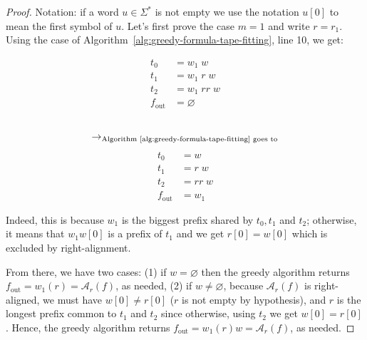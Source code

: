 \begin{proof}
    Notation: if a word $u\in\Sigma^*$ is not empty we use the notation $u[0]$ to mean the first symbol of $u$.
    Let's first prove the case $m=1$ and write $r = r_1$. Using the case of Algorithm~\ref{alg:greedy-formula-tape-fitting}, line 10, we get:
    \setlength{\columnsep}{-7.5cm}
    \begin{multicols}{3}
        \noindent
        \begin{align*}
            t_0          & = w_1\;  w      \\
            t_1          & = w_1\; r\;  w  \\
            t_2          & = w_1\; r r\; w \\
            f_\text{out} & = \varnothing
        \end{align*}
        \begin{align*}
             & \\
            \to_{\text{Algorithm~\ref{alg:greedy-formula-tape-fitting} goes to}}
        \end{align*}
        \begin{align*}
            t_0          & = w        \\
            t_1          & = r\;  w   \\
            t_2          & = r r\;  w \\
            f_\text{out} & = w_1
        \end{align*}
    \end{multicols}

    Indeed, this is because $w_1$ is the biggest prefix shared by $t_0, t_1$ and $t_2$; otherwise, it means that $w_1w[0]$ is a prefix of $t_1$ and we get $r[0] = w[0]$ which is excluded by right-alignment.

    From there, we have two cases: (1) if $w = \varnothing$ then the greedy algorithm returns $f_\text{out} = w_1 (r) = \mathcal{A}_r(f)$, as needed, (2) if $w \neq \varnothing$, because $\mathcal{A}_r(f)$ is right-aligned, we must have $w[0] \neq r[0]$ ($r$ is not empty by hypothesis), and $r$ is the longest prefix common to $t_1$ and $t_2$ since otherwise, using $t_2$ we get $w[0] = r[0]$. Hence, the greedy algorithm returns $f_\text{out} = w_1 (r) w = \mathcal{A}_r(f)$, as needed.



\end{proof}
